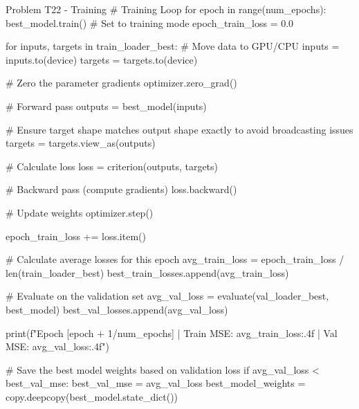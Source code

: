 \documentclass[12pt, a4paper]{article}
\begin{document}
            \begin{codeblock}{Problem T22 - Training}
                # Training Loop
                for epoch in range(num_epochs):
                    best_model.train() # Set to training mode
                    epoch_train_loss = 0.0
                    
                    for inputs, targets in train_loader_best:
                        # Move data to GPU/CPU
                        inputs = inputs.to(device)
                        targets = targets.to(device)
                        
                        # Zero the parameter gradients
                        optimizer.zero_grad()
                        
                        # Forward pass
                        outputs = best_model(inputs)
                        
                        # Ensure target shape matches output shape exactly to avoid broadcasting issues
                        targets = targets.view_as(outputs)
                        
                        # Calculate loss
                        loss = criterion(outputs, targets)
                        
                        # Backward pass (compute gradients)
                        loss.backward()
                        
                        # Update weights
                        optimizer.step()
                        
                        epoch_train_loss += loss.item()
                        
                    # Calculate average losses for this epoch
                    avg_train_loss = epoch_train_loss / len(train_loader_best)
                    best_train_losses.append(avg_train_loss)
                    
                    # Evaluate on the validation set
                    avg_val_loss = evaluate(val_loader_best, best_model)
                    best_val_losses.append(avg_val_loss)
                    
                    print(f"Epoch [{epoch + 1}/{num_epochs}] | Train MSE: {avg_train_loss:.4f} | Val MSE: {avg_val_loss:.4f}")
                    
                    # Save the best model weights based on validation loss
                    if avg_val_loss < best_val_mse:
                        best_val_mse = avg_val_loss
                        best_model_weights = copy.deepcopy(best_model.state_dict())
            \end{codeblock}
\end{document}
